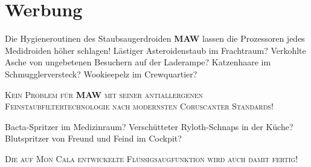 \documentclass[final]{multiversum}
\begin{document}
\makemultititle
%







\section{Werbung}


Die Hygieneroutinen des Staubsaugerdroiden \textbf{MAW} lassen die Prozessoren jedes Medidroiden höher schlagen!
Lästiger Asteroidenstaub im Frachtraum?
Verkohlte Asche von ungebetenen Besuchern auf der Laderampe?
Katzenhaare im Schmugglerversteck? Wookieepelz im Crewquartier?\\
\begin{center}\textsc{Kein Problem für \textbf{MAW} mit seiner antiallergenen Feinstaubfiltertechnologie nach modernsten Coruscanter Standards!}\\\end{center}
Bacta-Spritzer im Medizinraum?
Verschütteter Ryloth-Schnaps in der Küche?
Blutspritzer von Freund und Feind im Cockpit?\\
\begin{center}\textsc{Die auf Mon Cala entwickelte Flüssigsaugfunktion wird auch damit fertig!}\\\end{center}
\end{document}
